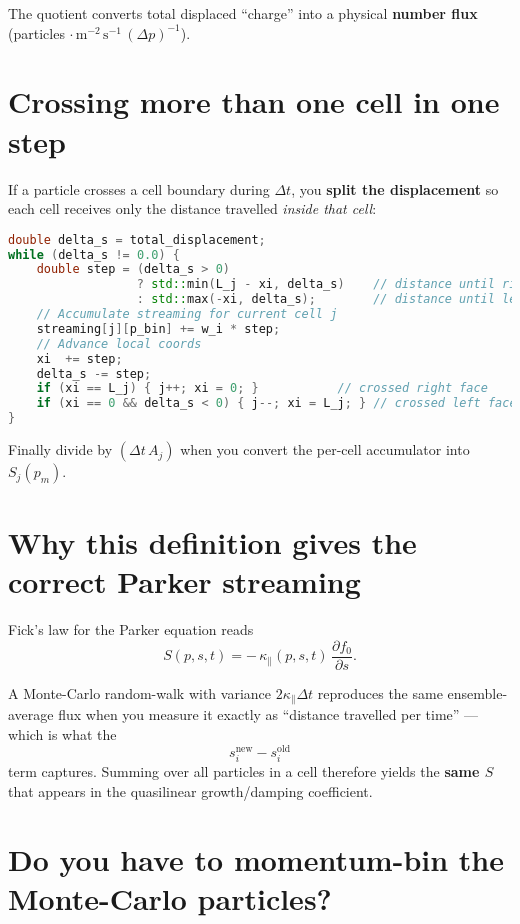 The quotient converts total displaced “charge” into a physical \textbf{number flux} (particles \( \cdot \, \text{m}^{-2} \, \text{s}^{-1} \, (\Delta p)^{-1} \)).

\bigskip

\section*{Crossing more than one cell in one step}

If a particle crosses a cell boundary during \( \Delta t \), you \textbf{split the displacement} so each cell receives only the distance travelled \emph{inside that cell}:
\begin{lstlisting}[language=C++, basicstyle=\ttfamily\small]
double delta_s = total_displacement;
while (delta_s != 0.0) {
    double step = (delta_s > 0)
                  ? std::min(L_j - xi, delta_s)    // distance until right face
                  : std::max(-xi, delta_s);        // distance until left face
    // Accumulate streaming for current cell j
    streaming[j][p_bin] += w_i * step;
    // Advance local coords
    xi  += step;
    delta_s -= step;
    if (xi == L_j) { j++; xi = 0; }           // crossed right face
    if (xi == 0 && delta_s < 0) { j--; xi = L_j; } // crossed left face
}
\end{lstlisting}

Finally divide by \( (\Delta t\,A_j) \) when you convert the per-cell accumulator into \( S_j(p_m) \).

\bigskip

\section*{Why this definition gives the correct Parker streaming}

Fick’s law for the Parker equation reads
\[
S(p,s,t) = -\,\kappa_{\parallel}(p,s,t)\,
           \frac{\partial f_0}{\partial s}.
\]

A Monte-Carlo random-walk with variance \( 2\kappa_\parallel\Delta t \) reproduces the same ensemble-average flux when you measure it exactly as “distance travelled per time” — which is what the
\[
s_i^{\text{new}} - s_i^{\text{old}}
\]
term captures. Summing over all particles in a cell therefore yields the \textbf{same \( S \)} that appears in the quasilinear growth/damping coefficient.

\section*{Do you \textbf{have} to momentum-bin the Monte-Carlo particles?}

